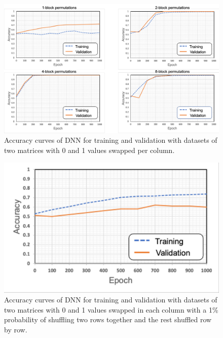 \begin{figure}[t]
    \begin{center}
        \includegraphics[width=1.00\columnwidth]{figures/SVGstripe_graph.pdf}
    \end{center}
    \vspace{-8pt}
	\caption{Accuracy curves of DNN for training and validation with datasets of two matrices with 0 and 1 values swapped per column.}
	\label{fig:accu_stripe}
\end{figure}

\begin{figure}[t]
    \begin{center}
        \includegraphics[width=0.8\columnwidth]{figures/graph_stripe_1block99ratio.pdf}
    \end{center}
    \vspace{-8pt}
	\caption{Accuracy curves of DNN for training and validation with datasets of two matrices with 0 and 1 values swapped in each column with a 1\% probability of shuffling two rows together and the rest shuffled row by row.}
	\label{fig:accu_stripe_1block99ratio}
\end{figure}

